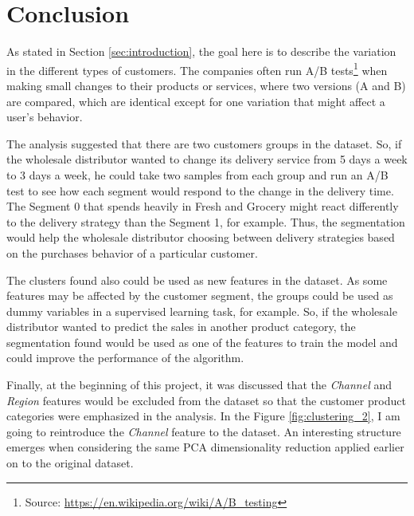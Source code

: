\documentclass[a4paper]{article}
\begin{document}

\section{Conclusion}
\label{sec:conclusion}

As stated in Section \ref{sec:introduction}, the goal here is to describe the variation in the different types of customers. The companies often run A/B tests\footnote{Source: \url{https://en.wikipedia.org/wiki/A/B_testing}} when making small changes to their products or services, where two versions (A and B) are compared, which are identical except for one variation that might affect a user's behavior.

The analysis suggested that there are two customers groups in the dataset. So, if the wholesale distributor wanted to change its delivery service from 5 days a week to 3 days a week, he could take two samples from each group and run an A/B test to see how each segment would respond to the change in the delivery time. The Segment 0 that spends heavily in Fresh and Grocery might react differently to the delivery strategy than the Segment 1, for example. Thus, the segmentation would help the wholesale distributor choosing between delivery strategies based on the purchases behavior of a particular customer.

The clusters found also could be used as new features in the dataset. As some features may be affected by the customer segment, the groups could be used as dummy variables in a supervised learning task, for example. So, if the wholesale distributor wanted to predict the sales in another product category, the segmentation found would be used as one of the features to train the model and could improve the performance of the algorithm.

Finally, at the beginning of this project, it was discussed that the \textit{Channel} and \textit{Region} features would be excluded from the dataset so that the customer product categories were emphasized in the analysis. In the Figure \ref{fig:clustering_2}, I am going to reintroduce the \textit{Channel} feature to the dataset. An interesting structure emerges when considering the same PCA dimensionality reduction applied earlier on to the original dataset.
\end{document}
